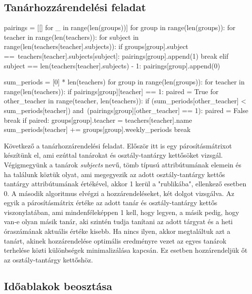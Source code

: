 \documentclass[12pt,a4paper]{report}
\begin{document}
\subsection{Tanárhozzárendelési feladat}

\begin{python}
pairings = [[] for _ in range(len(groups))]
for group in range(len(groups)):
    for teacher in range(len(teachers)):
        for subject in range(len(teachers[teacher].subjects)):
            if groups[group].subject ==\
               teachers[teacher].subjects[subject]:
                pairings[group].append(1)
                break
            elif subject == len(teachers[teacher].subjects) - 1:
                pairings[group].append(0)

sum_periods = [0] * len(teachers)
for group in range(len(groups)):
    for teacher in range(len(teachers)):
        if pairings[group][teacher] == 1:
            paired = True
            for other_teacher in range(teacher, len(teachers)):
                if (sum_periods[other_teacher] < 
                   sum_periods[teacher]) and\
                   (pairings[group][other_teacher] == 1):
                    paired = False
                    break
            if paired:
                groups[group].teacher = teachers[teacher].name
                sum_periods[teacher] += groups[group].weekly_periods
                break
\end{python}

Következő a tanárhozzárendelési feladat. Először itt is egy párosításmátrixot készítünk el, ami ezúttal tanárokat és osztály-tantárgy kettősöket vizsgál. Végigmegyünk a tanárok \textit{subjects} nevű, tömb típusú attribútumának elemein és ha találunk köztük olyat, ami megegyezik az adott osztály-tantárgy kettős tantárgy attribútumának értékével, akkor 1 kerül a "rublikába", ellenkező esetben 0.
A második algoritmus elvégzi a hozzárendeléseket, két dolgot vizsgálva. Az egyik a párosításmátrix értéke az adott tanár és osztály-tantárgy kettős viszonylatában, ami mindenféleképpen 1 kell, hogy legyen, a másik pedig, hogy van-e olyan másik tanár, aki szintén tudja tanítani az adott tárgyat és a heti óraszámának aktuális értéke kisebb. Ha nincs ilyen, akkor megtaláltuk azt a tanárt, akinek hozzárendelése optimális eredményre vezet az egyes tanárok terhelése közti különbségek minimalizálása kapcsán. Ez esetben hozzárendeljük őt az osztály-tantárgy kettőshöz.

\subsection{Időablakok beosztása}
\end{document}

